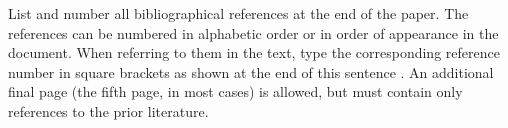 \documentclass{article}
\begin{document}
List and number all bibliographical references at the end of the
paper. The references can be numbered in alphabetic order or in
order of appearance in the document. When referring to them in
the text, type the corresponding reference number in square
brackets as shown at the end of this sentence \cite{C2}. An
additional final page (the fifth page, in most cases) is
allowed, but must contain only references to the prior
literature.

\printbibliography[heading=none]
\end{document}
